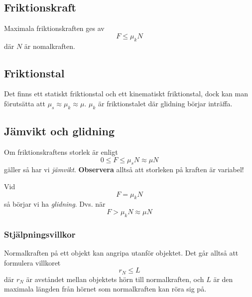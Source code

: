 \documentclass{article}
\newenvironment{ankiflashcard}[1]{}{}
\begin{document}
\begin{paracol}{2}
\begin{ankiflashcard}{Ange formeln/definitionen för friktionskraft.}
\subsection{Friktionskraft}
Maximala friktionskraften ges av
$$
F \leq \mu_k N
$$
där $N$ är nomalkraften.
\subsection{Friktionstal}
Det finns ett statiskt friktionstal och ett kinematiskt friktionstal, dock kan man förutsätta att $\mu_s \approx \mu_k \approx \mu$. $\mu_k$ är friktionstalet där glidning börjar inträffa.
\end{ankiflashcard}

\begin{ankiflashcard}{Ange jämviktsvillkor (friktion)}
\subsection{Jämvikt och glidning}
Om friktionskraftens storlek är enligt
$$
0\leq F \leq \mu_s N \approx \mu N
$$
gäller så har vi \textit{jämvikt}. \textbf{Observera} alltså att storleken på kraften är variabel!
\end{ankiflashcard}

\begin{ankiflashcard}{Ange glidningsvillkor (friktion)}
Vid $$F=\mu_kN$$ så börjar vi ha \textit{glidning}. Dvs. när
$$
F > \mu_k N \approx \mu N
$$
\end{ankiflashcard}

\begin{ankiflashcard}{Ange själpningsvillkor (friktion)}
\subsubsection{Stjälpningsvillkor}
Normalkraften på ett objekt kan angripa utanför objektet. Det går alltså att formulera villkoret 
$$r_N\leq L$$
där $r_N$ är avståndet mellan objektets hörn till normalkraften, och $L$ är den maximala längden från hörnet som normalkraften kan röra sig på.
\end{ankiflashcard}
\switchcolumn

\begin{ankiflashcard}{Hur definieras moment? (generella definitionen)}

\end{ankiflashcard}
\end{paracol}
\end{document}
